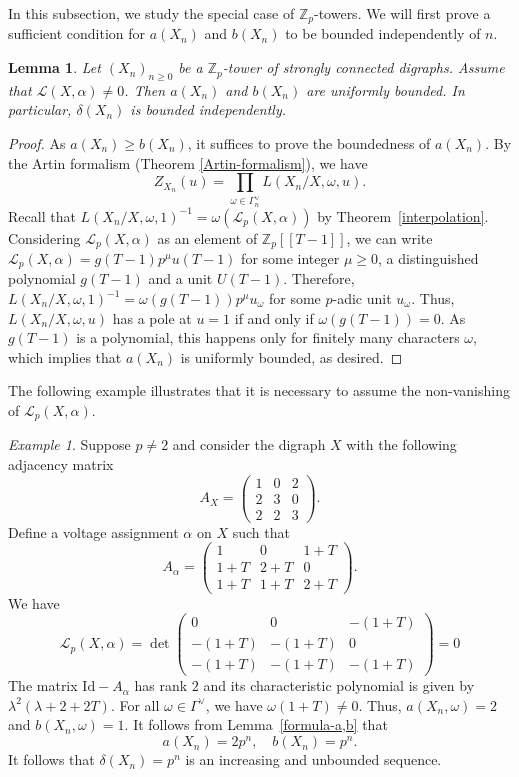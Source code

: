 \documentclass[11pt]{amsart}
\newtheorem{lemma}[theorem]{Lemma}
\numberwithin{equation}{section}
\theoremstyle{remark}
\newtheorem{example}[theorem]{Example}
\newcommand{\?}{\stackrel{?}{=}}
\newcommand{\cL}{\mathcal{L}}
\newcommand{\Zp}{\mathbb{Z}_p}
\newcommand{\Z}{\mathbb{Z}}
\begin{document}
In this subsection, we study the special case of $\Zp$-towers.
We will first prove a sufficient condition for $a(X_n)$ and $b(X_n)$ to be bounded independently of $n$. 
\begin{lemma}\label{lem:bounded-defect}
    Let $(X_n)_{n\ge0}$ be a $\Z_p$-tower of strongly connected digraphs. Assume that $\cL(X,\alpha)\neq 0$. 
    Then $a(X_n)$ and $b(X_n)$ are uniformly bounded.  In particular, $\delta(X_n)$ is bounded independently.
\end{lemma}
\begin{proof}
    As $a(X_n)\ge b(X_n)$, it suffices to prove the boundedness of $a(X_n)$. By the Artin formalism (Theorem \ref{Artin-formalism}), we have
    \[Z_{X_n}(u)=\prod_{\omega \in\Gamma_n^\vee}L(X_n/X,\omega,u).\]
    Recall that $L(X_n/X,\omega,1)^{-1}=\omega(\cL_p(X,\alpha))$ by Theorem~\ref{interpolation}. Considering  $\cL_p(X,\alpha)$ as an element of $\Zp[[T-1]]$, we can write $\cL_p(X,\alpha)=g(T-1)p^\mu u(T-1)$ for some integer $\mu\ge0$, a distinguished polynomial $g(T-1)$ and a unit $U(T-1)$. Therefore, $L(X_n/X,\omega,1)^{-1}=\omega(g(T-1))p^\mu u_\omega$ for some $p$-adic unit $u_\omega$. Thus,  $L(X_n/X,\omega,u)$ has a pole at $u=1$ if and only if $\omega(g(T-1))=0$. As $g(T-1)$ is a polynomial, this happens only for finitely many characters $\omega$, which implies that $a(X_n)$ is uniformly bounded, as desired. 
\end{proof}

The following example illustrates that it is necessary to assume the non-vanishing of $\cL_p(X,\alpha)$.

\begin{example}
Suppose $p\ne2$ and consider the digraph $X$ with the following adjacency matrix
    \[A_X=\begin{pmatrix}
     1&0&2\\
     2&3&0\\
     2&2&3
    \end{pmatrix}.\]
 Define a voltage assignment $\alpha$ on $X$ such that 
    \[A_\alpha=\begin{pmatrix}
        1&0&1+T\\
        1+T&2+T&0\\
        1+T&1+T&2+T
    \end{pmatrix}.\]
We have 
\[\cL_p(X,\alpha)=\det\begin{pmatrix}0&0&-(1+T)\\
-(1+T)&-(1+T)&0\\
-(1+T)&-(1+T)&-(1+T)
\end{pmatrix}=0\]
The
matrix $\mathrm{Id}-A_\alpha$ has rank $2$ and its characteristic polynomial is given by $\lambda^2(\lambda+2+2T)$. For all $\omega\in\Gamma^\vee$, we have $\omega(1+T)\ne0$. Thus, $a(X_n,\omega)=2$ and $b(X_n,\omega)=1$. It follows from Lemma~\ref{formula-a,b} that
\[a(X_n)=2p^n,\quad b(X_n)=p^n.\]
It follows that $\delta(X_n)=p^n$ is an increasing and unbounded sequence. 
\end{example}
\end{document}

